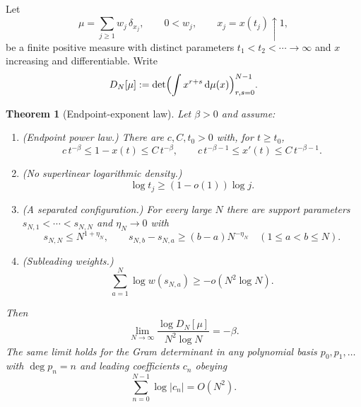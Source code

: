 \documentclass[11pt]{amsart}
\numberwithin{equation}{section}
\theoremstyle{plain}
\newtheorem{theorem}{Theorem}[section]
\theoremstyle{definition}
\theoremstyle{remark}
\newcommand{\dd}{\,\mathrm d}
\begin{document}
Let
\begin{equation}
\mu=\sum_{j\ge1}w_{j}\,\delta_{x_{j}},\qquad 0<w_{j},\qquad x_{j}=x(t_{j})\uparrow1,
\label{eq:measure}
\end{equation}
be a finite positive measure with distinct parameters $t_{1}<t_{2}<\cdots\to\infty$ and $x$
increasing and differentiable. Write
\begin{equation}
D_{N}[\mu]:=\det\Bigl(\int x^{r+s}\dd\mu(x)\Bigr)_{r,s=0}^{N-1}.
\label{eq:hankel}
\end{equation}

\begin{theorem}[Endpoint-exponent law]
\label{thm:endpoint}
Let $\beta>0$ and assume:
\begin{enumerate}[label=\textup{(\roman*)}]
\item \textup{(Endpoint power law.)} There are $c,C,t_{0}>0$ with, for $t\ge t_{0}$,
\begin{equation}
c\,t^{-\beta}\le1-x(t)\le C\,t^{-\beta},\qquad c\,t^{-\beta-1}\le x'(t)\le C\,t^{-\beta-1}.
\label{eq:power_law}
\end{equation}
\item \textup{(No superlinear logarithmic density.)}
\begin{equation}
\log t_{j}\ge(1-o(1))\log j .
\label{eq:node_scale}
\end{equation}
\item \textup{(A separated configuration.)} For every large $N$ there are support parameters
$s_{N,1}<\cdots<s_{N,N}$ and $\eta_{N}\to0$ with
\begin{equation}
s_{N,N}\le N^{1+\eta_{N}},\qquad s_{N,b}-s_{N,a}\ge(b-a)N^{-\eta_{N}}\quad(1\le a<b\le N).
\label{eq:separated}
\end{equation}
\item \textup{(Subleading weights.)}
\begin{equation}
\sum_{a=1}^{N}\log w(s_{N,a})\ge-o(N^{2}\log N).
\label{eq:weights}
\end{equation}
\end{enumerate}
Then
\begin{equation}
\boxed{\ \lim_{N\to\infty}\frac{\log D_{N}[\mu]}{N^{2}\log N}=-\beta.\ }
\label{eq:limit}
\end{equation}
The same limit holds for the Gram determinant in any polynomial basis $p_{0},p_{1},\dots$ with
$\deg p_{n}=n$ and leading coefficients $c_{n}$ obeying
\begin{equation}
\sum_{n=0}^{N-1}\log|c_{n}|=O(N^{2}).
\label{eq:basis}
\end{equation}
\end{theorem}
\end{document}
